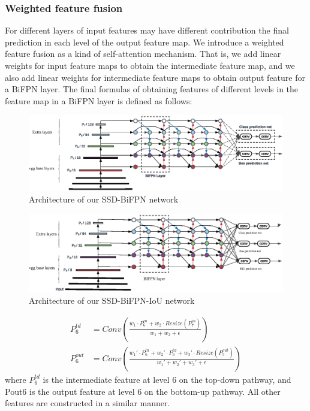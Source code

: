 \documentclass[journal,conference]{IEEEtran}
\begin{document}
\subsubsection{Weighted feature fusion}
For different layers of input features may have different contribution the final prediction in each level of the output feature map. We introduce a weighted feature fusion as a kind of self-attention mechanism. That is, we add linear weights for input feature maps to obtain the intermediate feature map, and we also add linear weights for intermediate feature maps to obtain output feature for a BiFPN layer. The final formulas of obtaining features of different levels in the feature map in a BiFPN layer is defined as follows:

\begin{figure}[htbp]
  \centering
  \includegraphics[width=\linewidth]{fig/ssd_bifpn.eps}
  \caption{Architecture of our SSD-BiFPN network}\label{fig:arch}
\end{figure}

\begin{figure}[htbp]
  \centering
  \includegraphics[width=\linewidth]{fig/ssd_iou.eps}
  \caption{Architecture of our SSD-BiFPN-IoU network}\label{fig:iou}
\end{figure}

\begin{align*}
  P_6^{td}  & =Conv\left(\frac{w_1\cdot P_6^{in}+w_2\cdot Resize(P_7^{in})}{w_1+w_2+\epsilon}\right)                              \\
  P_6^{out} & =Conv\left(\frac{w_1'\cdot P_6^{in}+w_2'\cdot P_6^{td}+w_3'\cdot Resize(P_5^{out})}{w_1'+w_2'+w_3'+\epsilon}\right)
\end{align*}
where $P_6^{td}$ is the intermediate feature at level 6 on the top-down pathway, and Pout6 is the output feature at level 6 on the bottom-up pathway. All other features are constructed in a similar manner.
\end{document}
